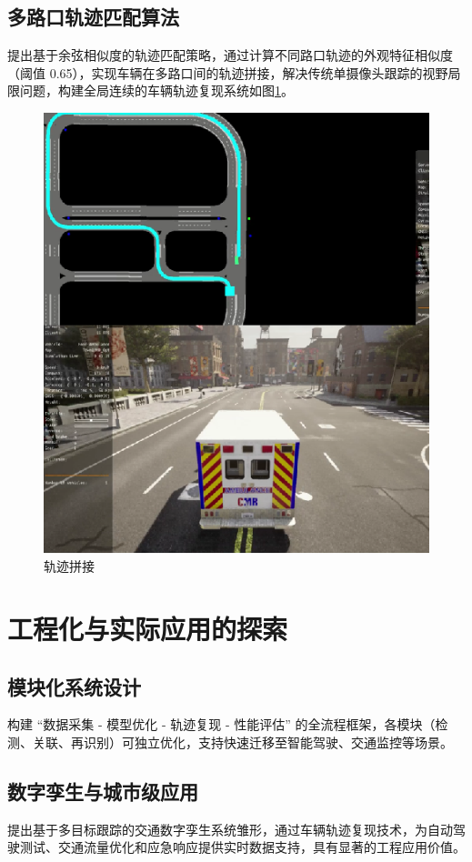 \subsection{多路口轨迹匹配算法}

提出基于余弦相似度的轨迹匹配策略，通过计算不同路口轨迹的外观特征相似度（阈值 0.65），实现车辆在多路口间的轨迹拼接，解决传统单摄像头跟踪的视野局限问题，构建全局连续的车辆轨迹复现系统如图\ref{fig:p32}。


\begin{figure}[htbp] %
	\centering
	\includegraphics[width=1\textwidth]{p32} %
	\caption{轨迹拼接} %
	\label{fig:p32} %
\end{figure}




\section{工程化与实际应用的探索}

\subsection{模块化系统设计}

构建 “数据采集 - 模型优化 - 轨迹复现 - 性能评估” 的全流程框架，各模块（检测、关联、再识别）可独立优化，支持快速迁移至智能驾驶、交通监控等场景。


\subsection{数字孪生与城市级应用}

提出基于多目标跟踪的交通数字孪生系统雏形，通过车辆轨迹复现技术，为自动驾驶测试、交通流量优化和应急响应提供实时数据支持，具有显著的工程应用价值。


